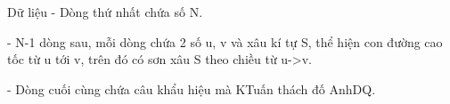 Dữ liệu
- Dòng thứ nhất chứa số N.   


   - N-1 dòng sau, mỗi dòng chứa 2 số u, v và xâu kí tự S, thể hiện con đường cao tốc từ u tới v, trên đó có sơn xâu S theo chiều từ u->v.   


   - Dòng cuối cùng chứa câu khẩu hiệu mà KTuấn thách đố AnhDQ.
